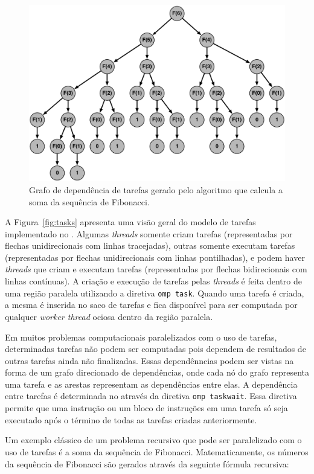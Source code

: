 \documentclass{SBCbookchapter}
\begin{document}
	\begin{figure}[t]
		\centering
		\includegraphics[width=0.8\linewidth]{img/fibonacci}
		\caption{Grafo de dependência de tarefas gerado pelo algoritmo que calcula a soma da sequência
		de Fibonacci.}\label{fig:fibonacci}
	\end{figure}
	
	A Figura~\ref{fig:tasks} apresenta uma visão geral do modelo de
	tarefas implementado no \openmp. Algumas \textit{threads} somente
	criam tarefas (representadas por flechas unidirecionais com linhas
	tracejadas), outras somente executam tarefas (representadas por
	flechas unidirecionais com linhas pontilhadas), e podem haver
	\textit{threads} que criam e executam tarefas (representadas por
	flechas bidirecionais com linhas contínuas).  A criação e execução
	de tarefas pelas \textit{threads} é feita dentro de uma região
	paralela utilizando a diretiva \texttt{omp task}. Quando uma tarefa
	é criada, a mesma é inserida no saco de tarefas e fica disponível
	para ser computada por qualquer \textit{worker thread} ociosa dentro
	da região paralela.

	Em muitos problemas computacionais paralelizados com o uso de
	tarefas, determinadas tarefas não podem ser computadas pois dependem
	de resultados de outras tarefas ainda não finalizadas. Essas
	dependênncias podem ser vistas na forma de um grafo direcionado de
	dependências, onde cada nó do grafo representa uma tarefa e as
	arestas representam as dependências entre elas. A dependência entre
	tarefas é determinada no \openmp através da diretiva \texttt{omp
	taskwait}. Essa diretiva permite que uma instrução ou um bloco de
	instruções em uma tarefa só seja executado após o término de todas
	as tarefas criadas anteriormente.
	
	Um exemplo clássico de um problema recursivo que pode ser
	paralelizado com o uso de tarefas é a soma da sequência de
	Fibonacci. Matematicamente, os números da sequência de Fibonacci são
	gerados através da seguinte fórmula recursiva:
	
\end{document}
